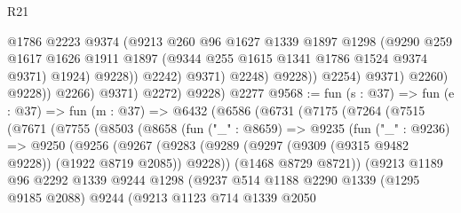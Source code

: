 \begin{lexlean}{R21}
\begin{coremodule}
                                  @1786
                                  @2223
                                  @9374
                                  (@9213
                                    @260
                                    @96
                                    @1627
                                    @1339
                                    @1897
                                    @1298
                                    (@9290
                                      @259
                                      @1617
                                      @1626
                                      @1911
                                      @1897
                                      (@9344 @255 @1615 @1341 @1786 @1524 @9374 @9371)
                                      @1924)
                                    @9228))
                                @2242)
                              @9371)
                            @2248)
                          @9228))
                      @2254)
                    @9371)
                  @2260)
                @9228))
            @2266)
          @9371)
        @2272)
      @9228)
    @2277
@9568 := fun (s : @37) =>
  fun (e : @37) =>
  fun (m : @37) =>
  @6432
    (@6586
      (@6731
        (@7175
          (@7264
            (@7515
              (@7671
                (@7755
                  (@8503
                    (@8658
                      (fun ("_" : @8659) =>
                      @9235
                        (fun ("_" : @9236) =>
                        @9250
                          (@9256
                            (@9267
                              (@9283
                                (@9289
                                  (@9297 (@9309 (@9315 @9482 @9228)) (@1922 @8719 @2085))
                                  @9228))
                              (@1468 @8729 @8721))
                            (@9213
                              @1189
                              @96
                              @2292
                              @1339
                              @9244
                              @1298
                              (@9237
                                @514
                                @1188
                                @2290
                                @1339
                                (@1295 @9185 @2088)
                                @9244
                                (@9213
                                  @1123
                                  @714
                                  @1339
                                  @2050

\end{coremodule}
\end{lexlean}
